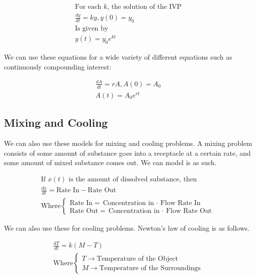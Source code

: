 \documentclass[12pt, landscape, twocolumn]{article}
\begin{document}
    \begin{equation}\label{eq:growthdecay}
    \begin{aligned}
    \text{For each $k$, the solution of the IVP}\\
    \frac{dy}{dt} = ky, y(0) = y_0\\
    \text{Is given by}\\
    y(t) = y_0 e^{kt}
    \end{aligned}
    \end{equation}

    We can use these equations for a wide variety of different equations such as continuously compounding interest:

    \begin{equation}\label{eq:ccinterest}
    \begin{aligned}
    \frac{dA}{dt} = rA, A(0)=A_0\\
    A(t) = A_0 e^{rt}
    \end{aligned}
    \end{equation}

    \subsection{Mixing and Cooling}

    We can also use these models for mixing and cooling problems. A mixing problem consists of some amount of substance goes into a receptacle at a certain rate, and some amount of mixed substance comes out. We can model is as such.

    \begin{equation}\label{eq:mixcool}
    \begin{aligned}
    \text{If $x(t)$ is the amount of dissolved substance, then}\\
    \frac{dx}{dt} = \text{Rate In} - \text{Rate Out}\\
    \text{Where}
    \begin{cases}
    \text{Rate In} = \text{Concentration in $\cdot$ Flow Rate In}\\
    \text{Rate Out} = \text{Concentration in $\cdot$ Flow Rate Out}
    \end{cases}
    \end{aligned}
    \end{equation}

    We can also use these for cooling problems. Newton's law of cooling is as follows.

    \begin{equation}\label{eq:newtoncool}
    \begin{aligned}
    \frac{dT}{dt} = k (M - T)\\
    \text{Where}
    \begin{cases}
    T \to \text{Temperature of the Object}\\
    M \to \text{Temperature of the Surroundings}
    \end{cases}
    \end{aligned}
    \end{equation}
\end{document}
